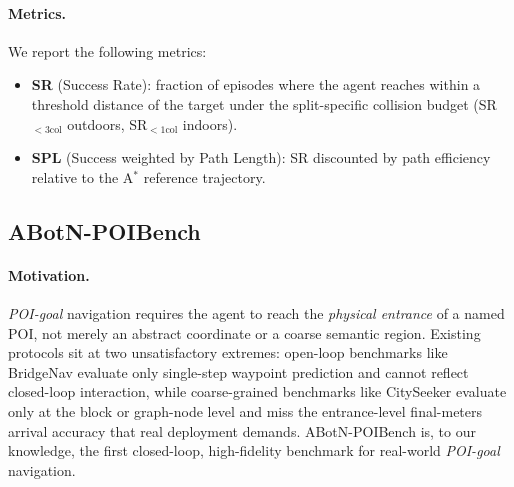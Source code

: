 \paragraph{Metrics.}
We report the following metrics:
\begin{itemize}[nosep,leftmargin=1.2em]
\item \textbf{SR} (Success Rate): fraction of episodes where the
  agent reaches within a threshold distance of the target under the
  split-specific collision budget (SR$_{<3\text{col}}$ outdoors,
  SR$_{<1\text{col}}$ indoors).
\item \textbf{SPL} (Success weighted by Path Length): SR discounted
  by path efficiency relative to the A$^{\!*}$ reference trajectory.
\end{itemize}



\subsection{ABotN-POIBench}
\label{sec:bench-poigoal}

\paragraph{Motivation.}
\textit{POI-goal} navigation requires the agent to reach the
\emph{physical entrance} of a named POI, not merely an abstract
coordinate or a coarse semantic region. Existing protocols sit at
two unsatisfactory extremes: open-loop benchmarks like BridgeNav
evaluate only single-step waypoint prediction and cannot reflect
closed-loop interaction, while coarse-grained benchmarks like
CitySeeker evaluate only at the block or graph-node level and
miss the entrance-level final-meters arrival accuracy that real
deployment demands. ABotN-POIBench is, to our knowledge, the first
closed-loop, high-fidelity benchmark for real-world \textit{POI-goal}
navigation.

